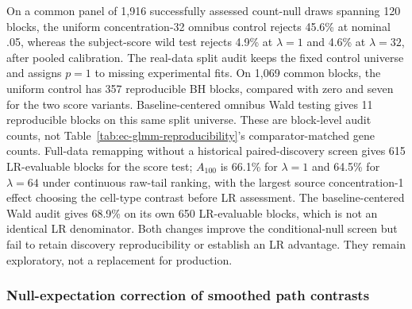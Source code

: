 \documentclass[11pt]{article}
\begin{document}
On a common panel of 1,916 successfully assessed count-null draws spanning 120 blocks, the uniform concentration-32 omnibus control rejects 45.6\% at nominal .05, whereas the subject-score wild test rejects 4.9\% at \(\lambda=1\) and 4.6\% at \(\lambda=32\), after pooled calibration. The real-data split audit keeps the fixed control universe and assigns \(p=1\) to missing experimental fits. On 1,069 common blocks, the uniform control has 357 reproducible BH blocks, compared with zero and seven for the two score variants. Baseline-centered omnibus Wald testing gives 11 reproducible blocks on this same split universe. These are block-level audit counts, not Table~\ref{tab:ec-glmm-reproducibility}'s comparator-matched gene counts. Full-data remapping without a historical paired-discovery screen gives 615 LR-evaluable blocks for the score test; \(A_{100}\) is 66.1\% for \(\lambda=1\) and 64.5\% for \(\lambda=64\) under continuous raw-tail ranking, with the largest source concentration-1 effect choosing the cell-type contrast before LR assessment. The baseline-centered Wald audit gives 68.9\% on its own 650 LR-evaluable blocks, which is not an identical LR denominator. Both changes improve the conditional-null screen but fail to retain discovery reproducibility or establish an LR advantage. They remain exploratory, not a replacement for production.

\subsubsection*{Null-expectation correction of smoothed path contrasts}
\end{document}
